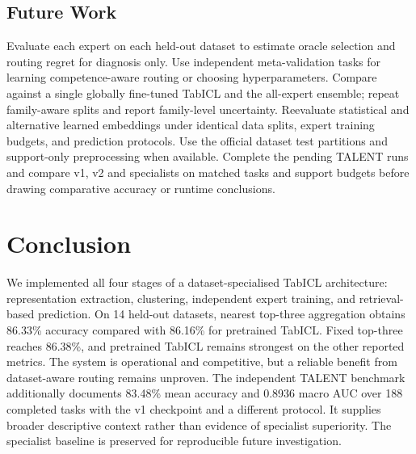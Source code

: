 \documentclass[conference]{IEEEtran}
\begin{document}
\subsection{Future Work}
Evaluate each expert on each held-out dataset to estimate oracle selection and routing regret for diagnosis only. Use independent meta-validation tasks for learning competence-aware routing or choosing hyperparameters. Compare against a single globally fine-tuned TabICL and the all-expert ensemble; repeat family-aware splits and report family-level uncertainty. Reevaluate statistical and alternative learned embeddings under identical data splits, expert training budgets, and prediction protocols. Use the official dataset test partitions and support-only preprocessing when available. Complete the pending TALENT runs and compare v1, v2 and specialists on matched tasks and support budgets before drawing comparative accuracy or runtime conclusions.

\section{Conclusion}
We implemented all four stages of a dataset-specialised TabICL architecture: representation extraction, clustering, independent expert training, and retrieval-based prediction. On 14 held-out datasets, nearest top-three aggregation obtains 86.33\% accuracy compared with 86.16\% for pretrained TabICL. Fixed top-three reaches 86.38\%, and pretrained TabICL remains strongest on the other reported metrics. The system is operational and competitive, but a reliable benefit from dataset-aware routing remains unproven. The independent TALENT benchmark additionally documents 83.48\% mean accuracy and 0.8936 macro AUC over 188 completed tasks with the v1 checkpoint and a different protocol. It supplies broader descriptive context rather than evidence of specialist superiority. The specialist baseline is preserved for reproducible future investigation.
\end{document}
